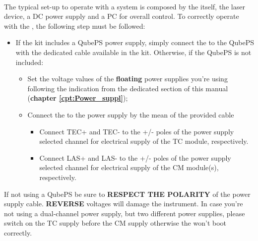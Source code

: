 \paragraph{} The typical set-up to operate with a \QubeModel  system is composed by the \QubeModel  itself, the laser device, a DC power supply and a PC for overall control.
\newline
To correctly operate with the \QubeModel , the following step must be followed:
\begin{itemize}
    \item If the \QubeModel  kit includes a QubePS power supply, simply connect the \QubeModel  to the QubePS with the dedicated cable available in the kit.
    \newline Otherwise, if the QubePS is not included:
    \begin{itemize}
        \item Set the voltage values of the \textbf{floating} power supplies you're using following the indication from the dedicated section of this manual (\textbf{chapter \ref{cpt:Power_suppl}});
        \item Connect the \QubeModel  to the power supply by the mean of the provided cable
        \begin{itemize}
            \item Connect TEC+ and TEC- to the +/- poles of the power supply selected channel for electrical supply of the TC module, respectively. 
            \item Connect LAS+ and LAS- to the +/- poles of the power supply selected channel for electrical supply of the CM module(s), respectively.
        \end{itemize}
    \end{itemize}
\end{itemize}

\begin{tcolorbox}[enhanced,attach boxed title to top center={yshift=-3mm,yshifttext=-1mm},
  colback=black!5!white,colframe=red!75!black,colbacktitle=red!80!black,
  title=CAUTION,fonttitle=\bfseries,
  boxed title style={size=small,colframe=black!50!black} ]
            If not using a QubePS be sure to \textbf{RESPECT THE POLARITY} of the power supply cable. \textbf{REVERSE} voltages will damage the instrument. 
            \newline In case you're not using a dual-channel power supply, but two different power supplies, please switch on the TC supply before the CM supply otherwise the \QubeModel  won't boot correctly.
\end{tcolorbox}

